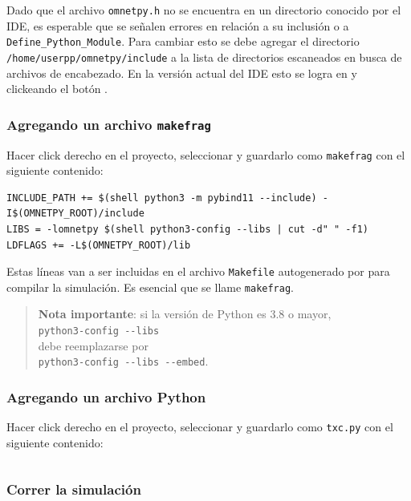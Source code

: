 \documentclass[]{article}
\begin{document}
\inputminted{c++}{codelistings/tictoc.cc}

Dado que el archivo \verb!omnetpy.h! no se encuentra en un directorio conocido
por el IDE, es esperable que se señalen errores en relación a su inclusión o a
\verb!Define_Python_Module!. Para cambiar esto se debe agregar el directorio
\verb!/home/userpp/omnetpy/include! a la lista de directorios escaneados en
busca de archivos de encabezado. En la versión actual del IDE esto se logra en
 y clickeando el botón .

\subsubsection{Agregando un archivo \texttt{makefrag}}

Hacer click derecho en el proyecto, seleccionar  y
guardarlo como \verb!makefrag! con el siguiente contenido:

\begin{verbatim}
INCLUDE_PATH += $(shell python3 -m pybind11 --include) -I$(OMNETPY_ROOT)/include
LIBS = -lomnetpy $(shell python3-config --libs | cut -d" " -f1)
LDFLAGS += -L$(OMNETPY_ROOT)/lib
\end{verbatim}

Estas líneas van a ser incluidas en el archivo \verb!Makefile! autogenerado por
\omnetpp{} para compilar la simulación. Es esencial que se llame
\verb!makefrag!.

\begin{quotation}
\noindent\textbf{Nota importante}: si la versión de Python es 3.8 o mayor,\\
\verb!python3-config --libs!\\
debe reemplazarse por\\
\verb!python3-config --libs --embed!.
\end{quotation}

\subsubsection{Agregando un archivo Python}

Hacer click derecho en el proyecto, seleccionar  y
guardarlo como \verb!txc.py! con el siguiente contenido:

\inputminted{Python}{codelistings/tictoc.py}

\subsubsection{Correr la simulación}
\end{document}
